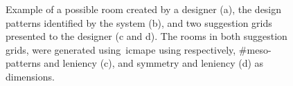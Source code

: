 \begin{figure}[!h]
    \centering
     \hfill
     
     \hfill
    
    \caption{Example of a possible room created by a designer (a), the design patterns identified by the system (b), and two suggestion grids presented to the designer (c and d). The rooms in both suggestion grids, were generated using~\acrshort{icmape} using respectively, \#meso-patterns and leniency (c), and symmetry and leniency (d) as dimensions.}
    \label{fig:corridorExample}
\end{figure}

